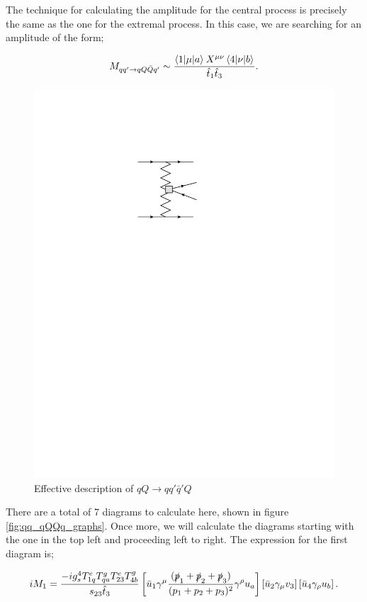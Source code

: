 The technique for calculating the amplitude for the central process is precisely the same as the one for the extremal process. In this case, we are searching for an amplitude of the form;

\begin{equation}
M_{qq' \to qQ\bar{Q}q'} \sim \frac{\mathinner{\langle1\vert\mu\vert a\rangle}_{}X^{\mu \nu} \mathinner{\langle4\vert\nu\vert b\rangle}_{}}{\hat{t}_1 \hat{t}_3}.
\end{equation}

\begin{figure}[t]
\centering
\includegraphics{Images/qq_qqqq_eff.pdf}
\caption{Effective description of $qQ \to qq'\bar{q}' Q$}
\end{figure}

There are a total of 7 diagrams to calculate here, shown in figure \ref{fig:qq_qQQq_graphs}. Once more, we will calculate the diagrams starting with the one in the top left and proceeding left to right. The expression for the first diagram is;

\begin{equation}
iM_1 = \frac{- i g_s^4 T^e_{1q}T^g_{qa}T^e_{23}T^g_{4b}}{s_{23} \hat{t}_3} \left[ \bar{u}_1 \gamma^\mu \frac{(\slashed{p}_1+\slashed{p}_2 + \slashed{p}_3)}{(p_1 + p_2 + p_3)^2} \gamma^\rho u_a \right] \left[\bar{u}_2 \gamma_\mu v_3 \right] \left[ \bar{u}_4 \gamma_\rho u_b \right].
\end{equation}

